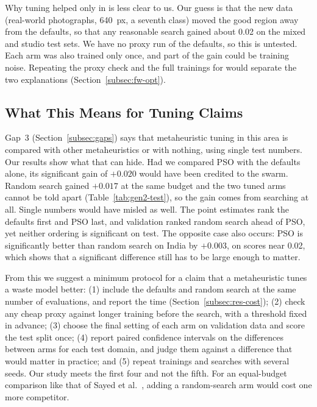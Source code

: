 Why tuning helped only in \gentwo is less clear to us. Our guess is that the new data (real-world photographs, 640~px, a seventh class) moved the good region away from the defaults, so that any reasonable search gained about 0.02 \mapfifty on the mixed and studio test sets. We have no \gentwo proxy run of the defaults, so this is untested. Each arm was also trained only once, and part of the gain could be training noise. Repeating the proxy check and the full trainings for \gentwo would separate the two explanations (Section~\ref{subsec:fw-opt}).

\subsection{What This Means for Tuning Claims}
\label{subsec:implications}

Gap~3 (Section~\ref{subsec:gaps}) says that metaheuristic tuning in this area is compared with other metaheuristics or with nothing, using single test numbers. Our results show what that can hide. Had we compared PSO with the defaults alone, its significant \gentwo gain of $+0.020$ \mapfifty would have been credited to the swarm. Random search gained $+0.017$ at the same budget and the two tuned arms cannot be told apart (Table~\ref{tab:gen2-test}), so the gain comes from searching at all. Single numbers would have misled as well. The \genone point estimates rank the defaults first and PSO last, and \gentwo validation ranked random search ahead of PSO, yet neither ordering is significant on test. The opposite case also occurs: PSO is significantly better than random search on India by $+0.003$, on scores near 0.02, which shows that a significant difference still has to be large enough to matter.

From this we suggest a minimum protocol for a claim that a metaheuristic tunes a waste model better: (1) include the defaults and random search at the same number of evaluations, and report the time (Section~\ref{subsec:res-cost}); (2) check any cheap proxy against longer training before the search, with a threshold fixed in advance; (3) choose the final setting of each arm on validation data and score the test split once; (4) report paired confidence intervals on the differences between arms for each test domain, and judge them against a difference that would matter in practice; and (5) repeat trainings and searches with several seeds. Our study meets the first four and not the fifth. For an equal-budget comparison like that of Sayed et al.~\cite{sayed2024intelligent}, adding a random-search arm would cost one more competitor.

